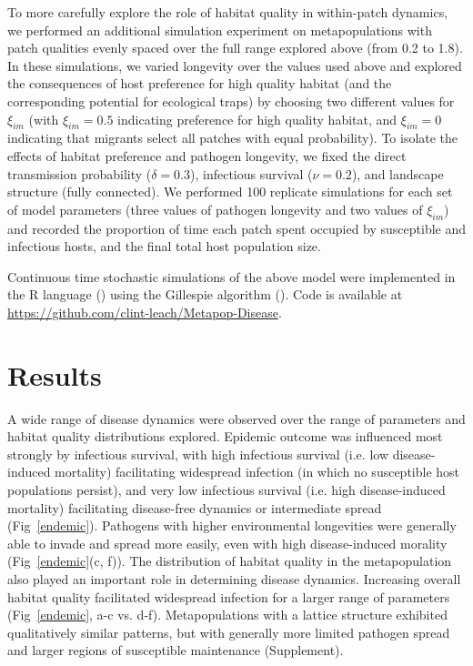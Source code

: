 \documentclass{article}
\begin{document}
To more carefully explore the role of habitat quality in within-patch dynamics, we performed an additional simulation experiment on metapopulations with patch qualities evenly spaced over the full range explored above (from 0.2 to 1.8).
In these simulations, we varied longevity over the values used above and explored the consequences of host preference for high quality habitat (and the corresponding potential for ecological traps) by choosing two different values for $\xi_{im}$ (with $\xi_{im} = 0.5$ indicating preference for high quality habitat, and  $\xi_{im} = 0$ indicating that migrants select all patches with equal probability).  
To isolate the effects of habitat preference and pathogen longevity, we fixed the direct transmission probability ($\delta = 0.3$), infectious survival ($\nu = 0.2$), and landscape structure (fully connected).
We performed 100 replicate simulations for each set of model parameters (three values of pathogen longevity and two values of $\xi_{im}$) and recorded the proportion of time each patch spent occupied by susceptible and infectious hosts, and the final total host population size.

Continuous time stochastic simulations of the above model were implemented in the R language (\cite{R2014}) using the Gillespie algorithm (\cite{Gillespie1977}).  Code is available at \url{https://github.com/clint-leach/Metapop-Disease}.

\section{Results}
\label{results}

A wide range of disease dynamics were observed over the range of parameters and habitat quality distributions explored.  
Epidemic outcome was influenced most strongly by infectious survival, with high infectious survival (i.e. low disease-induced mortality) facilitating widespread infection (in which no susceptible host populations persist), and very low infectious survival (i.e. high disease-induced mortality) facilitating disease-free dynamics or intermediate spread (Fig~\ref{endemic}). 
Pathogens with higher environmental longevities were generally able to invade and spread more easily, even with high disease-induced morality (Fig~\ref{endemic}(c, f)).  
The distribution of habitat quality in the metapopulation also played an important role in determining disease dynamics.  Increasing overall habitat quality facilitated widespread infection for a larger range of parameters (Fig~\ref{endemic}, a-c vs. d-f).
Metapopulations with a lattice structure exhibited qualitatively similar patterns, but with generally more limited pathogen spread and larger regions of susceptible maintenance (Supplement).
\end{document}
